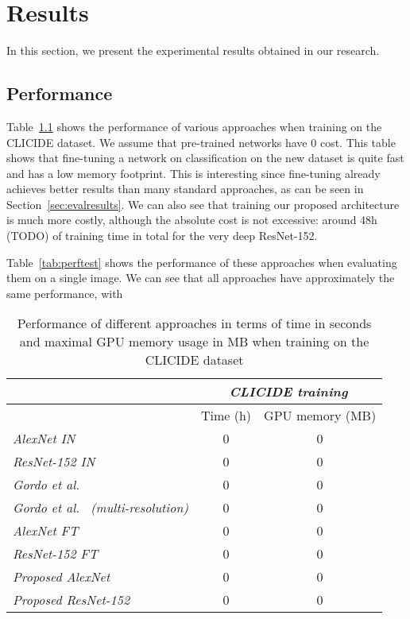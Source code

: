 
\chapter{Results}
In this section, we present the experimental results obtained in our
research.

\section{Performance}\label{sec:perfresults}
Table~\ref{tab:perftrain} shows the performance of various approaches
when training on the CLICIDE dataset. We assume that pre-trained
networks have 0 cost. This table shows that fine-tuning a network
on classification on the new dataset is quite fast and has a low memory
footprint. This is interesting since fine-tuning already achieves better
results than many standard approaches, as can be seen in
Section~\ref{sec:evalresults}.
We can also see that training our proposed architecture is much
more costly, although the absolute cost is not excessive:
around 48h (TODO) of training time in total for the very deep ResNet-152.

Table~\ref{tab:perftest} shows the performance of these approaches
when evaluating them on a single image. We can see that all approaches
have approximately the same performance, with %

\begin{table}
\begin{tabular}{|l|c|c|}
\hline & \multicolumn{2}{c|}{\emph{CLICIDE training}}\\
\hline & Time (h) & GPU memory (MB)\\
\hline \emph{AlexNet IN} & 0 & 0\\
\hline \emph{ResNet-152 IN} & 0 & 0\\
\hline \emph{Gordo et al.~\cite{gordo_deep_2016}} & 0 & 0\\
\hline \emph{Gordo et al.~\cite{gordo_deep_2016} (multi-resolution)}
& 0 & 0\\
\hline \emph{AlexNet FT} & 0 & 0\\ %
\hline \emph{ResNet-152 FT} & 0 & 0\\
\hline \emph{Proposed AlexNet} & 0 & 0\\ %
\hline \emph{Proposed ResNet-152} & 0 & 0\\
\hline
\end{tabular}
\caption{Performance of different approaches in terms of time in seconds and
maximal GPU memory usage in MB when training on the CLICIDE dataset
\label{tab:perftrain}}
\end{table}

